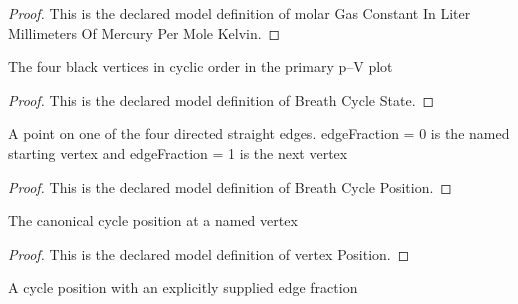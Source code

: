 \begin{proof}
  This is the declared model definition of molar Gas Constant In Liter Millimeters Of Mercury Per Mole Kelvin.
\end{proof}
\begin{definition}
  \label{def:physics:phyx-mini-0336:phyxminiproblems-problemphyxmini0336-breathcyclestate}
  The four black vertices in cyclic order in the primary p–V plot
\end{definition}
\begin{proof}
  This is the declared model definition of Breath Cycle State.
\end{proof}
\begin{definition}
  \label{def:physics:phyx-mini-0336:phyxminiproblems-problemphyxmini0336-breathcycleposition}
  A point on one of the four directed straight edges. edgeFraction = 0 is the named starting vertex and edgeFraction = 1 is the next vertex
\end{definition}
\begin{proof}
  This is the declared model definition of Breath Cycle Position.
\end{proof}
\begin{definition}
  \label{def:physics:phyx-mini-0336:phyxminiproblems-problemphyxmini0336-vertexposition}
  The canonical cycle position at a named vertex
\end{definition}
\begin{proof}
  This is the declared model definition of vertex Position.
\end{proof}
\begin{definition}
  \label{def:physics:phyx-mini-0336:phyxminiproblems-problemphyxmini0336-positiononedge}
  A cycle position with an explicitly supplied edge fraction
\end{definition}

